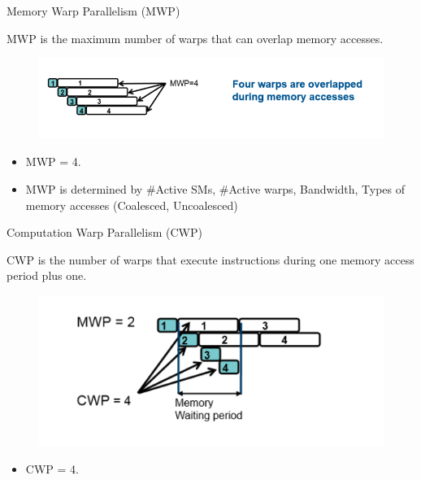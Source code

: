 \begin{frame}[fragile]{Memory Warp Parallelism (MWP)}
	\begin{block}{}
        MWP is the maximum number of warps that can overlap memory accesses.
        \begin{center}
            \begin{figure}[H]
                \includegraphics[scale=0.4]{figures/MWP.png}
            \end{figure}
        \end{center}
        \begin{itemize}
            \item MWP = 4.
            \item MWP is determined by \#Active SMs, \#Active warps, Bandwidth, Types of memory accesses (Coalesced, Uncoalesced)
        \end{itemize}
    \end{block}
\end{frame}

\begin{frame}[fragile]{Computation Warp Parallelism (CWP)}
	\begin{block}{}
        CWP is the number of warps that execute instructions during one memory access period plus one.
        \begin{center}
            \begin{figure}[H]
                \includegraphics[scale=0.5]{figures/CWP.png}
            \end{figure}
        \end{center}
        \begin{itemize}
            \item CWP = 4.
        \end{itemize}
    \end{block}
\end{frame}

